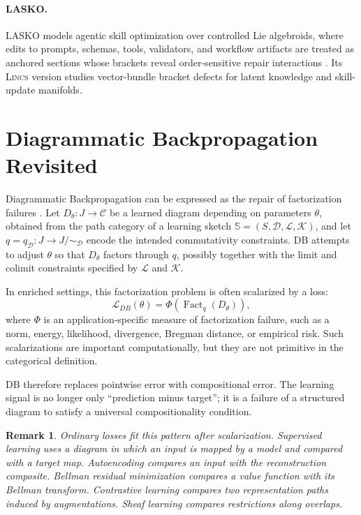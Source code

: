 \documentclass{article}
\newtheorem{remark}{Remark}
\newcommand{\C}{\mathcal{C}}
\newcommand{\Loss}{\mathcal{L}}
\newcommand{\Fact}{\operatorname{Fact}}
\begin{document}
\paragraph{LASKO.}
LASKO models agentic skill optimization over controlled Lie algebroids, where edits to prompts, schemas, tools, validators, and workflow artifacts are treated as anchored sections whose brackets reveal order-sensitive repair interactions \citep{mahadevan2026lasko}. Its \textsc{Lincs}   version studies vector-bundle bracket defects for latent knowledge and skill-update manifolds.

\section{Diagrammatic Backpropagation Revisited}

Diagrammatic Backpropagation can be expressed as the repair of factorization failures \citep{mahadevan2026catagi}. Let \(D_\theta:J\to\C\) be a learned diagram depending on parameters \(\theta\), obtained from the path category of a learning sketch \(\mathbb S=(S,\mathcal D,\mathcal L,\mathcal K)\), and let \(q=q_{\mathcal D}:J\to J/{\sim_{\mathcal D}}\) encode the intended commutativity constraints. DB attempts to adjust \(\theta\) so that \(D_\theta\) factors through \(q\), possibly together with the limit and colimit constraints specified by \(\mathcal L\) and \(\mathcal K\).

In enriched settings, this factorization problem is often scalarized by a loss:
\[
\Loss_{DB}(\theta)=\Phi(\Fact_q(D_\theta)),
\]
where \(\Phi\) is an application-specific measure of factorization failure, such as a norm, energy, likelihood, divergence, Bregman distance, or empirical risk. Such scalarizations are important computationally, but they are not primitive in the categorical definition.

DB therefore replaces pointwise error with compositional error. The learning signal is no longer only ``prediction minus target''; it is a failure of a structured diagram to satisfy a universal compositionality condition.

\begin{remark}
Ordinary losses fit this pattern after scalarization. Supervised learning uses a diagram in which an input is mapped by a model and compared with a target map. Autoencoding compares an input with the reconstruction composite. Bellman residual minimization compares a value function with its Bellman transform. Contrastive learning compares two representation paths induced by augmentations. Sheaf learning compares restrictions along overlaps.
\end{remark}
\end{document}
